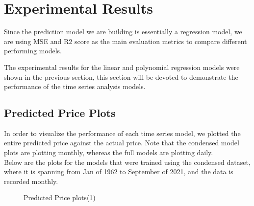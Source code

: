 \documentclass{article}
\begin{document}
\section{Experimental Results} 

Since the prediction model we are building is essentially a regression model, we are using MSE and R2 score as the main evaluation metrics to compare different performing models. 

The experimental results for the linear and polynomial regression models were shown in the previous section, this section will be devoted to demonstrate the performance of the time series analysis models.

\subsection{Predicted Price Plots}

In order to visualize the performance of each time series model, we plotted the entire predicted price against the actual price. Note that the condensed model plots are plotting monthly, whereas the full models are plotting daily.\\

Below are the plots for the models that were trained using the condensed dataset, where it is spanning from Jan of 1962 to September of 2021, and the data is recorded monthly.

\begin{figure}[H]
    \qquad
    \caption{Predicted Price plots(1)}
    \label{fig:example}
\end{figure}
\end{document}
